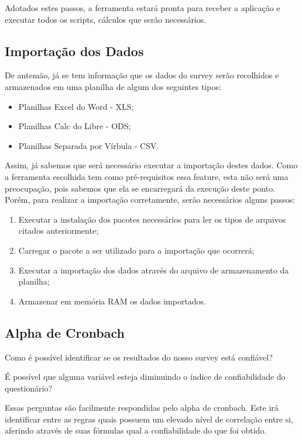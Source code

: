 Adotados estes passos, a ferramenta estará pronta para receber a aplicação e executar todos os scripts, cálculos que serão
necessários.

\subsection{Importação dos Dados}
\label{sub:importa_o_dos_dados}
De antemão, já se tem informação que  os dados do survey serão recolhidos e armazenados em uma planilha de algum dos seguintes tipos:

\begin{itemize}
    \item Planilhas Excel do Word - XLS;
    \item Planilhas Calc do Libre - ODS;
    \item Planilhas Separada por Vírbula - CSV.
\end{itemize}

Assim, já sabemos que será necessário executar a importação destes dados. Como a ferramenta escolhida tem como pré-requisitos
essa feature, esta não será uma preocupação, pois sabemos que ela se encarregará da execução deste ponto. Porém, para realizar
a importação corretamente, serão necessários alguns passos:

\begin{enumerate}
    \item Executar a instalação dos pacotes necessários para ler os tipos de arquivos citados anteriormente;
    \item Carregar o pacote a ser utilizado para a importação que ocorrerá;
    \item Executar a importação dos dados através do arquivo de armazenamento da planilha;
    \item Armazenar em memória RAM os dados importados.
\end{enumerate}

\subsection{Alpha de Cronbach}
\label{sub:alpha_de_cronbach}
Como é possível identificar se os resultados do nosso survey está confiável?

É possível que alguma variável esteja diminuindo o índice de confiabilidade do questionário?

Essas perguntas são facilmente respondidas pelo alpha de cronbach. Este irá identificar entre as regras quais possuem
um elevado nível de correlação entre si, aferindo através de suas fórmulas qual a confiabilidade do que foi obtido.

